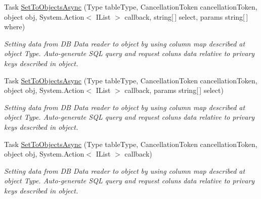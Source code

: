 \begin{DoxyCompactItemize}
Task \mbox{\hyperlink{interface_uniform_data_operator_1_1_sql_1_1_i_sql_operator_a1a913ae60feb71cdf262e4e42e79bceb}{Set\+To\+Objects\+Async}} (Type table\+Type, Cancellation\+Token cancellation\+Token, object obj, System.\+Action$<$ I\+List $>$ callback, string\mbox{[}$\,$\mbox{]} select, params string\mbox{[}$\,$\mbox{]} where)
\begin{DoxyCompactList}\small\item\em Setting data from DB Data reader to object by using column map described at object Type. Auto-\/generate S\+QL query and request coluns data relative to privary keys described in object. \end{DoxyCompactList}\item 
Task \mbox{\hyperlink{interface_uniform_data_operator_1_1_sql_1_1_i_sql_operator_ab2b82841cfb00ba1b8b46de5edf15e77}{Set\+To\+Objects\+Async}} (Type table\+Type, Cancellation\+Token cancellation\+Token, object obj, System.\+Action$<$ I\+List $>$ callback, params string\mbox{[}$\,$\mbox{]} select)
\begin{DoxyCompactList}\small\item\em Setting data from DB Data reader to object by using column map described at object Type. Auto-\/generate S\+QL query and request coluns data relative to privary keys described in object. \end{DoxyCompactList}\item 
Task \mbox{\hyperlink{interface_uniform_data_operator_1_1_sql_1_1_i_sql_operator_a2844a6839130dfab7cbe7541787f7dfe}{Set\+To\+Objects\+Async}} (Type table\+Type, Cancellation\+Token cancellation\+Token, object obj, System.\+Action$<$ I\+List $>$ callback)
\begin{DoxyCompactList}\small\item\em Setting data from DB Data reader to object by using column map described at object Type. Auto-\/generate S\+QL query and request coluns data relative to privary keys described in object. \end{DoxyCompactList}\end{DoxyCompactItemize}
